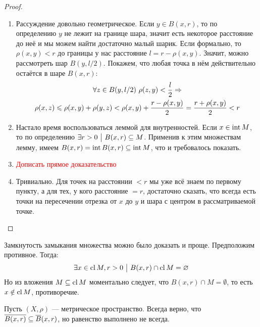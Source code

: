 \begin{proof}~
	\begin{enumerate}
		\item Рассуждение довольно геометрическое. Если $y \in B(x, r)$, то по определению $y$ не лежит на границе шара, значит есть некоторое расстояние до неё и мы можем найти достаточно малый шарик. Если формально, то $\rho(x, y) < r$ до границы у нас расстояние $l = r - \rho(x, y)$. Значит, можно рассмотреть шар $B(y, l / 2)$. Покажем, что любая точка в нём действительно остаётся в шаре $B(x, r)$:
		\begin{multline*}
			\forall z \in B(y, l / 2)\ \rho(z, y) < \frac{l}{2} \Rightarrow
			\\
			\rho(x, z) \leqslant \rho(x, y) + \rho(y, z) < \rho(x, y) + \frac{r - \rho(x, y)}{2} = \frac{r + \rho(x, y)}{2} < r
		\end{multline*}
		
		\item Настало время воспользоваться леммой для внутренностей. Если $x \in \operatorname{int} M$, то по определению $\exists r > 0 \ \big|\  B(x, r) \subseteq M$. Применив к этим множествам лемму, имеем $B(x, r) = \operatorname{int} B(x, r) \subseteq \operatorname{int} M$, что и требовалось показать.
		
		\item \textcolor{red}{Дописать прямое доказательство}
		
		\item Тривиально. Для точек на расстоянии $< r$ мы уже всё знаем по первому пункту, а для тех, у кого расстояние $= r$, достаточно сказать, что всегда есть точки на пересечении отрезка от $x$ до $y$ и шара с центром в рассматриваемой точке.
	\end{enumerate}
\end{proof}

\begin{anote}
	Замкнутость замыкания множества можно было доказать и проще. Предположим противное. Тогда:
	\[
		\exists x \in \operatorname{cl} M, r > 0 \ \big|\  B(x, r) \cap \operatorname{cl} M = \varnothing
	\]
	Но из вложения $M \subseteq \operatorname{cl} M$ моментально следует, что $B(x, r) \cap M = \emptyset$, то есть $x \notin \operatorname{cl} M$, противоречие.
\end{anote}

\begin{proposition}
	Пусть $(X, \rho)$ --- метрическое пространство. Всегда верно, что \\ $\overline{B(x, r)} \subseteq \overline{B}(x, r)$, но равенство выполнено не всегда.
\end{proposition}

